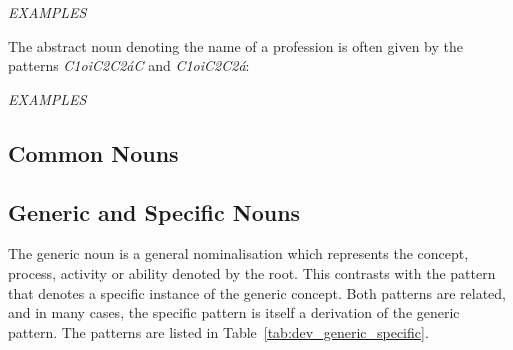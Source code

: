 \documentclass[grammar]{subfiles}
\begin{document}
  \begin{exe}
    \ex \emph{EXAMPLES}
  \end{exe}

  The abstract noun denoting the name of a profession is often given by the patterns \textit{C\sub1oiC\sub2C\sub2áC} and \textit{C\sub1oiC\sub2C\sub2á}:

  \begin{exe}
    \ex \emph{EXAMPLES}
  \end{exe}

  \subsection{Common Nouns}
  \label{ssec:dev_common_nouns}

  \ToBeWritten

  \subsection{Generic and Specific Nouns}
  \label{ssec:dev_generic_nouns}

  The generic noun is a general nominalisation which represents the concept, process, activity or ability denoted by the root. This contrasts with the pattern that denotes a specific instance of the generic concept. Both patterns are related, and in many cases, the specific pattern is itself a derivation of the generic pattern. The patterns are listed in Table~\ref{tab:dev_generic_specific}.
\end{document}

